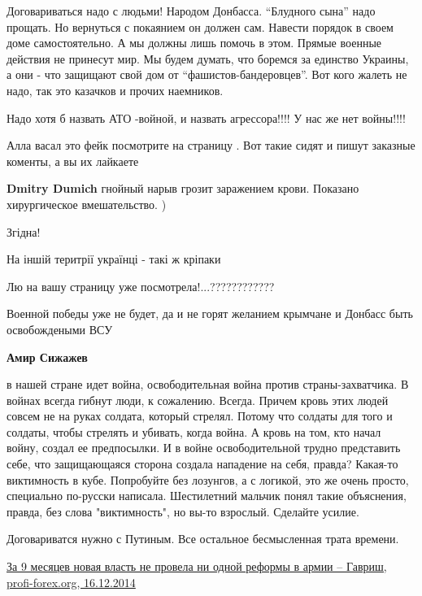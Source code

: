 \begin{itemize}

Договариваться надо с людьми! Народом Донбасса. \enquote{Блудного сына} надо прощать.
Но вернуться с покаянием он должен сам. Навести порядок в своем доме
самостоятельно. А мы должны лишь помочь в этом. Прямые военные действия не
принесут мир. Мы будем думать, что боремся за единство Украины, а они - что
защищают свой дом от \enquote{фашистов-бандеровцев}. Вот кого жалеть не надо, так это
казачков и прочих наемников.

Надо хотя б назвать АТО -войной, и назвать агрессора!!!! У нас же нет войны!!!!

Алла васал это фейк посмотрите на страницу . Вот такие сидят и пишут заказные коменты, а вы их лайкаете

\textbf{Dmitry Dumich} гнойный нарыв грозит заражением крови. Показано хирургическое вмешательство. )

Згідна!

На іншій теритрії українці - такі ж кріпаки

Лю на вашу страницу уже посмотрела!...????????????

Военной победы уже не будет, да и не горят желанием крымчане и Донбасс быть освобождеными ВСУ

\textbf{Амир Сижажев} 

в нашей стране идет война, освободительная война против страны-захватчика. В
войнах всегда гибнут люди, к сожалению. Всегда. Причем кровь этих людей совсем
не на руках солдата, который стрелял. Потому что солдаты для того и солдаты,
чтобы стрелять и убивать, когда война. А кровь на том, кто начал войну, создал
ее предпосылки. И в войне освободительной трудно представить себе, что
защищающаяся сторона создала нападение на себя, правда? Какая-то виктимность в
кубе. Попробуйте без лозунгов, а с логикой, это же очень просто, специально
по-русски написала. Шестилетний мальчик понял такие объяснения, правда, без
слова "виктимность", но вы-то взрослый. Сделайте усилие.


Договариватся нужно с Путиным. Все остальное бесмысленная трата времени.


\href{http://www.profi-forex.org/novosti-mira/novosti-sng/ukraine/entry1008238612.html}{%
За 9 месяцев новая власть не провела ни одной реформы в армии – Гавриш, profi-forex.org, 16.12.2014%
}


\end{itemize}
